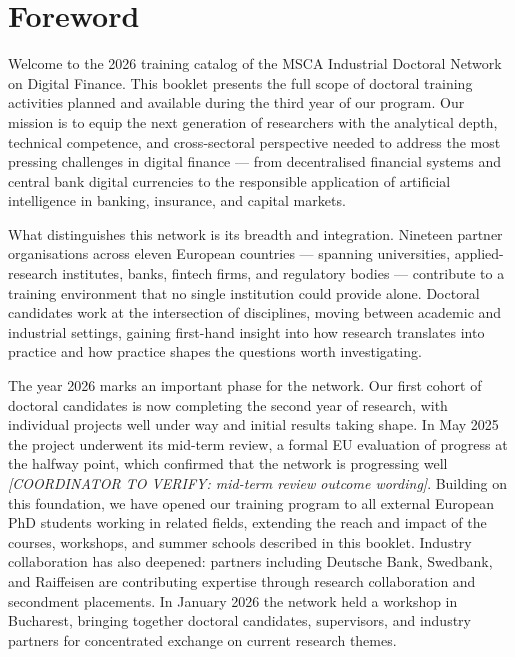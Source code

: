 \chapter*{Foreword}

Welcome to the 2026 training catalog of the MSCA Industrial Doctoral Network on
Digital Finance. This booklet presents the full scope of doctoral training activities
planned and available during the third year of our program. Our mission is to equip
the next generation of researchers with the analytical depth, technical competence,
and cross-sectoral perspective needed to address the most pressing challenges in
digital finance --- from decentralised financial systems and central bank digital
currencies to the responsible application of artificial intelligence in banking,
insurance, and capital markets.

What distinguishes this network is its breadth and integration. Nineteen
partner organisations across eleven European countries --- spanning universities,
applied-research institutes, banks, fintech firms, and regulatory bodies --- contribute
to a training environment that no single institution could provide alone. Doctoral
candidates work at the intersection of disciplines, moving between academic and
industrial settings, gaining first-hand insight into how research translates into
practice and how practice shapes the questions worth investigating.

The year 2026 marks an important phase for the network. Our first cohort of doctoral
candidates is now completing the second year of research, with individual projects
well under way and initial results taking shape. In May 2025 the project underwent
its mid-term review, a formal EU evaluation of progress at the halfway point, which
confirmed that the network is progressing well \emph{[COORDINATOR TO VERIFY: mid-term review outcome wording]}. Building on this
foundation, we have opened our training program to all external European PhD students
working in related fields, extending the reach and impact of the courses, workshops,
and summer schools described in this booklet. Industry collaboration has also deepened:
partners including Deutsche Bank, Swedbank, and Raiffeisen are contributing expertise
through research collaboration and secondment placements. In
January 2026 the network held a workshop in Bucharest, bringing together doctoral
candidates, supervisors, and industry partners for concentrated exchange on current
research themes.

